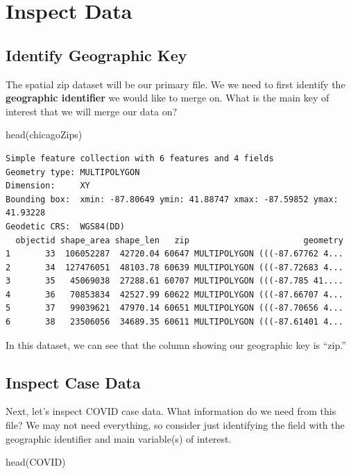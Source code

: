 \documentclass[
  letterpaper,
  DIV=11,
  numbers=noendperiod]{scrreprt}
\newenvironment{Shaded}{\begin{snugshade}}{\end{snugshade}}
\newcommand{\FunctionTok}[1]{\textcolor[rgb]{0.28,0.35,0.67}{#1}}
\newcommand{\NormalTok}[1]{\textcolor[rgb]{0.00,0.23,0.31}{#1}}
\begin{document}
\section{Inspect Data}\label{inspect-data}

\subsection{Identify Geographic Key}\label{identify-geographic-key}

The spatial zip dataset will be our primary file. We we need to first
identify the \textbf{geographic identifier} we would like to merge on.
What is the main key of interest that we will merge our data on?

\begin{Shaded}
\begin{Highlighting}[]
\FunctionTok{head}\NormalTok{(chicagoZips)}
\end{Highlighting}
\end{Shaded}

\begin{verbatim}
Simple feature collection with 6 features and 4 fields
Geometry type: MULTIPOLYGON
Dimension:     XY
Bounding box:  xmin: -87.80649 ymin: 41.88747 xmax: -87.59852 ymax: 41.93228
Geodetic CRS:  WGS84(DD)
  objectid shape_area shape_len   zip                       geometry
1       33  106052287  42720.04 60647 MULTIPOLYGON (((-87.67762 4...
2       34  127476051  48103.78 60639 MULTIPOLYGON (((-87.72683 4...
3       35   45069038  27288.61 60707 MULTIPOLYGON (((-87.785 41....
4       36   70853834  42527.99 60622 MULTIPOLYGON (((-87.66707 4...
5       37   99039621  47970.14 60651 MULTIPOLYGON (((-87.70656 4...
6       38   23506056  34689.35 60611 MULTIPOLYGON (((-87.61401 4...
\end{verbatim}

In this dataset, we can see that the column showing our geographic key
is ``zip.''

\subsection{Inspect Case Data}\label{inspect-case-data}

Next, let's inspect COVID case data. What information do we need from
this file? We may not need everything, so consider just identifying the
field with the geographic identifier and main variable(s) of interest.

\begin{Shaded}
\begin{Highlighting}[]
\FunctionTok{head}\NormalTok{(COVID)}
\end{Highlighting}
\end{Shaded}
\end{document}
